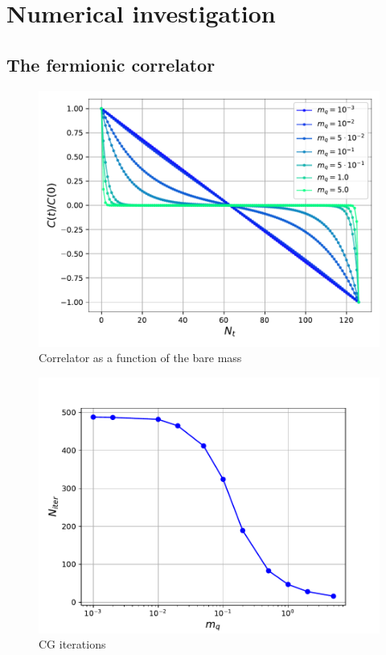 \chapter{Numerical investigation}
\label{chapt:results}


\section{The fermionic correlator}

\begin{figure}
    \centering 
    \includegraphics[scale=0.6]{figures/correlator/correlator.pdf}
    \caption{Correlator as a function of the bare mass}
    \label{fig:correlator_mass}
\end{figure}

\begin{figure}
    \centering 
    \includegraphics[scale=0.6]{figures/correlator/CGiter.pdf}
    \caption{CG iterations}
    \label{fig:correlator_mass}
\end{figure}

